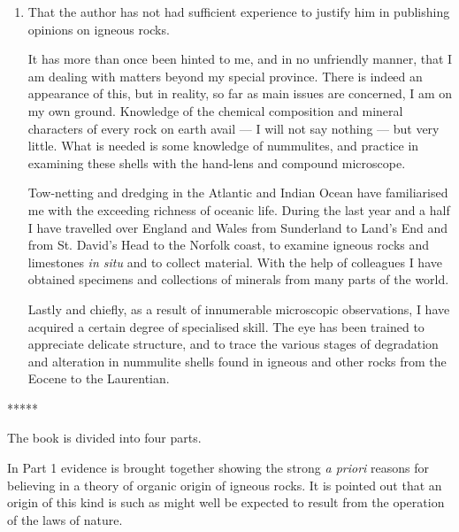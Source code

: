\documentclass[a4paper, 12pt, oneside]{article}
\begin{document}
\begin{enumerate}
  \item That the author has not had sufficient experience to justify him in publishing opinions on igneous rocks.

\hspace*{5mm}It has more than once been hinted to me, and in no unfriendly manner, that I am dealing with matters beyond my special province. There is indeed an appearance of this, but in reality, so far as main issues are concerned, I am on my own ground. Knowledge of the chemical composition and mineral characters of every rock on earth avail --- I will not say nothing --- but very little. What is needed is some knowledge of nummulites, and practice in examining these shells with the hand-lens and compound microscope.

\hspace*{5mm}Tow-netting and dredging in the Atlantic and Indian Ocean have familiarised me with the exceeding richness of oceanic life. During the last year and a half I have travelled over England and Wales from Sunderland to Land's End and from St. David's Head to the Norfolk coast, to examine igneous rocks and limestones \emph{in situ} and to collect material. With the help of colleagues I have obtained specimens and collections of minerals from many parts of the world.

\hspace*{5mm}Lastly and chiefly, as a result of innumerable microscopic observations, I have acquired a certain degree of specialised skill. The eye has been trained to appreciate delicate structure, and to trace the various stages of degradation and alteration in nummulite shells found in igneous and other rocks from the Eocene to the Laurentian.
\end{enumerate}

\centerline{*\hspace{15mm}*\hspace{15mm}*\hspace{15mm}*\hspace{15mm}*}
\bigskip

The book is divided into four parts.

In Part 1 evidence is brought together showing the strong \emph{a priori} reasons for believing in a theory of organic origin of igneous rocks. It is pointed out that an origin of this kind is such as might well be expected to result from the operation of the laws of nature.
\end{document}
